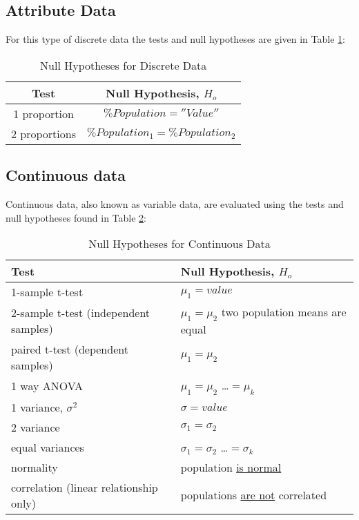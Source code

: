 \subsection{Attribute Data}
For this type of discrete data the tests and null hypotheses are given in Table \ref{tab1}:\\

\begin{table}[h]\caption{Null Hypotheses for Discrete Data}\label{tab1}
\begin{center}
\begin{tabular}{|c|c|}
\hline \textbf{Test} & \textbf{Null Hypothesis}, $H_{o}$  \\ 
\hline 1 proportion & $\%Population =  ''Value'' $\\ 
\hline 2 proportions & $\%Population_{1} = \%Population_{2}$ \\ 
\hline 
\end{tabular} 
\end{center}
\end{table}
\subsection{Continuous data}
Continuous data, also known as variable data, are evaluated using the tests and null hypotheses found in Table \ref{tab2}:
\begin{table}[h]\caption{Null Hypotheses for Continuous Data}\label{tab2}
\begin{center}
\begin{tabular}{|l|l|}
\hline \textbf{Test} & \textbf{Null Hypothesis}, $H_{o}$ \\ 
\hline 1-sample t-test & $\mu_{1} = value$ \\ 
\hline 2-sample t-test (independent samples) & $\mu_{1} = \mu_{2}$ two population means are equal \\ 
\hline paired t-test (dependent samples) & $\mu_{1} = \mu_{2}$ \\ 
\hline 1 way ANOVA & $\mu_{1} = \mu_{2}$  \dots $= \mu_{k}$ \\ 
\hline 1 variance, $\sigma^{2}$ &  $ \sigma =  value$ \\ 
\hline 2 variance & $\sigma_{1} = \sigma_{2}$ \\ 
\hline equal variances & $\sigma_{1} = \sigma_{2}$ \dots $= \sigma_{k}$  \\ 
\hline normality & population \underline{is normal} \\ 
\hline correlation (linear relationship only) & populations \underline{are not} correlated  \\ 
\hline 
\end{tabular} 
\end{center}
\end{table}

